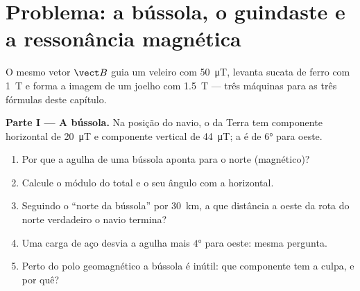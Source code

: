 \section{Problema: a bússola, o guindaste e a ressonância magnética}

\begin{problem}
\label{pb:g11:magnetic-fields:1}
O mesmo vetor $\vect B$ guia um veleiro com \qty{50}{\micro T}, levanta
sucata de ferro com \qty{1}{T} e forma a imagem de um joelho com
\qty{1.5}{T} --- três máquinas para as três fórmulas deste capítulo.

\medskip
\noindent\textbf{Parte I --- A bússola.}
Na posição do navio, o  da Terra tem componente horizontal de
\qty{20}{\micro T} e componente vertical de \qty{44}{\micro T}; a
 é de $\ang{6}$ para oeste.
\begin{enumerate}
  \item Por que a agulha de uma bússola aponta para o norte (magnético)?
  \item Calcule o módulo do  total e o seu ângulo com a horizontal.
  \item Seguindo o ``norte da bússola'' por \qty{30}{km}, a que distância
        a oeste da rota do norte verdadeiro o navio termina?
  \item Uma carga de aço desvia a agulha mais $\ang{4}$ para oeste: mesma
        pergunta.
  \item Perto do polo geomagnético a bússola é inútil: que componente tem
        a culpa, e por quê?
\end{enumerate}


\end{problem}
